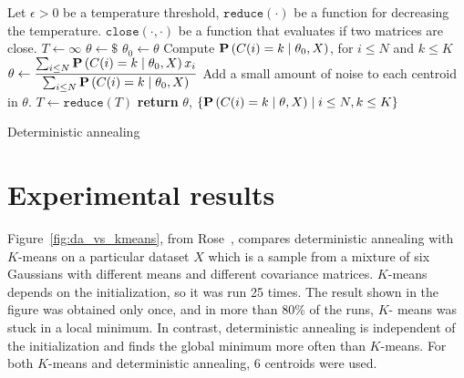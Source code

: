 \begin{algorithm}
\begin{algorithmic}[1]
\State Let
\State \qquad $\epsilon > 0$ be a temperature threshold,
\State \qquad $\texttt{reduce}(\cdot)$ be a function for decreasing the temperature.
\State \qquad $\texttt{close}\left(\cdot, \cdot\right)$ be a function that evaluates if two matrices are close.
\State $T \gets \infty$ 
\State $\theta \gets \$$ 
\Repeat
\State $\theta_0 \gets \theta$
\State Compute $\mathbf{P}\left(C(i) = k \mid \theta_0, X\right)$, for $i \leq N$ and $k \leq K$
\State $\displaystyle \theta \gets \frac{\sum_{i \leq N} \mathbf{P}\left(C(i) = k \mid \theta_0, X\right) x_i}{\sum_{i \leq N} \mathbf{P}\left(C(i) = k \mid \theta_0, X\right)}$
\State Add a small amount of noise to each centroid in $\theta$.
\State $T \gets \texttt{reduce}(T)$
\EndWhile
\State \textbf{return} $\theta$, $\{\mathbf{P}\left(C(i) = k \mid \theta, X\right) \mid i \leq N, k \leq K\}$
\EndFunction
\end{algorithmic}
\caption{Deterministic annealing}
\label{algo:da_algo_da}
\end{algorithm}

\section{Experimental results}
\label{sec:experiments}

Figure~\ref{fig:da_vs_kmeans}, from Rose~\cite{rose1991deterministic, rose1998deterministic}, compares deterministic annealing with $K$-means
on a particular dataset $X$ which is a sample from a mixture of six Gaussians
with different means and different covariance matrices. $K$-means depends
on the initialization, so it was run 25 times. The result shown in the
figure was obtained only once, and in more than 80\% of the runs, $K$-
means was stuck in a local minimum. In contrast, deterministic annealing
is independent of the initialization and finds the global minimum more
often than $K$-means. For both $K$-means and deterministic annealing, 6
centroids were used.

